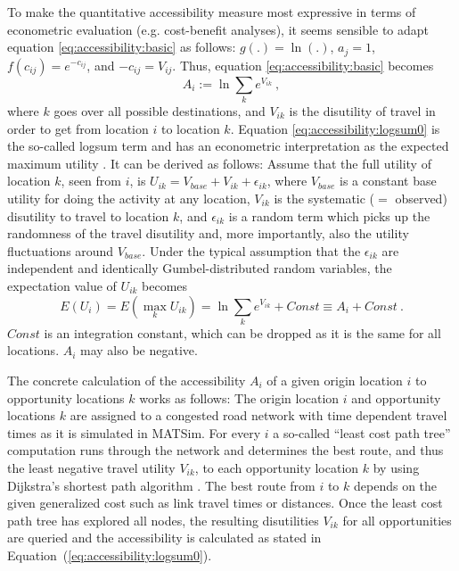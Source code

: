 To make the quantitative accessibility measure most expressive in terms of econometric evaluation (e.g. cost-benefit analyses), it seems sensible to adapt equation \ref{eq:accessibility:basic} as follows: $g(.) = \ln(.)$, $a_j = 1$, $f(c_{ij}) = e^{-c_{ij}}$, and $-c_{ij} = V_{ij}$. Thus, equation \ref{eq:accessibility:basic} becomes
\begin{equation}
A_i := \ln \sum_k e^{V_{ik}} \ ,
\label{eq:accessibility:logsum0}
\end{equation}
where $k$ goes over all possible destinations, and $V_{ik}$ is the
disutility of travel in order to get from location $i$ to location
$k$. Equation \ref{eq:accessibility:logsum0} is the so-called logsum term and has an econometric interpretation as the expected maximum utility \citep[e.g.][]{Ben-AkivaBook}. It can be derived as follows: Assume that the full utility of location $k$, seen from $i$, is $U_{ik} = V_{base} + V_{ik} + \epsilon_{ik}$, where $V_{base}$ is a constant base utility for doing the activity at any location, $V_{ik}$ is the systematic ($=$ observed) disutility to travel to location $k$, and $\epsilon_{ik}$ is a random term which picks up the randomness of the travel disutility and, more importantly, also the utility fluctuations around $V_{base}$.  Under the typical assumption that the $\epsilon_{ik}$ are independent and identically Gumbel-distributed random variables, the expectation value of $U_{ik}$ becomes
\begin{equation}
E(U_i) = E(\max_k U_{ik}) = \ln \sum_k e^{V_{ik}} + Const \equiv A_i + Const \ .
\end{equation}
$Const$ is an integration constant, which can be dropped as it is the same for all locations. $A_i$ may also be negative.

The concrete calculation of the accessibility $A_i$ of a given origin location $i$ to opportunity locations $k$ works as follows: The origin location $i$ and opportunity locations $k$ are assigned to a congested road network with time dependent travel times as it is simulated in MATSim. For every $i$ a so-called ``least cost path tree'' computation runs through the network and determines the best route, and thus the least negative travel utility $V_{ik}$, to each opportunity location $k$ by using Dijkstra's shortest path algorithm \citep{Dijkstra1959ShortestPath}. The best route from $i$ to $k$ depends on the given generalized cost such as link travel times or distances. Once the least cost path tree has explored all nodes, the resulting disutilities $V_{ik}$ for all opportunities are queried and the accessibility is calculated as stated in Equation~(\ref{eq:accessibility:logsum0}).


